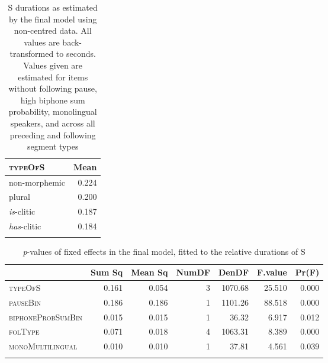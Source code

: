 \begin{table}[H]\fontsize{10}{11}
\caption{S durations as estimated by the final model using non-centred data. All values are back-transformed to seconds. Values given are estimated for items without following pause, high biphone sum probability, monolingual speakers, and across all preceding and following segment types}
\label{tab:4.8}
\begin{tabular}{lr} 
\lsptoprule
\textsc{typeOfS}                      & Mean   \\ 
\midrule
non-morphemic                & 0.224  \\
plural                       & 0.200  \\
\textit{is}-clitic           & 0.187  \\
\textit{has}-clitic          & 0.184  \\
\lspbottomrule
\end{tabular}
\end{table}




\begin{table}[H]\fontsize{10}{11}
\caption{\textit{p}-values of fixed effects in the final model, fitted to the relative durations of S}
\label{tab:4.9}
\centering
\begin{tabular}{lrrrrrr} 
\lsptoprule
~                 & Sum Sq & Mean Sq & NumDF & DenDF   & F.value & Pr(F)  \\ 
\midrule
\textsc{typeOfS}           & 0.161  & 0.054   & 3     & 1070.68 & 25.510  & 0.000  \\
\textsc{pauseBin}          & 0.186  & 0.186   & 1     & 1101.26 & 88.518  & 0.000  \\
\textsc{biphoneProbSumBin} & 0.015  & 0.015   & 1     & 36.32   & 6.917   & 0.012  \\
\textsc{folType}           & 0.071  & 0.018   & 4     & 1063.31 & 8.389   & 0.000  \\
\textsc{monoMultilingual}  & 0.010  & 0.010   & 1     & 37.81   & 4.561   & 0.039  \\
\lspbottomrule
\end{tabular}
\end{table}




